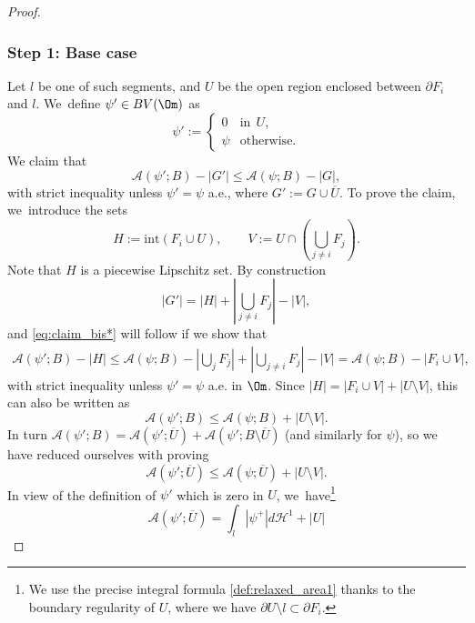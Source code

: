 \begin{proof}
\subsubsection*{Step 1: Base case} Let $l$ be one of such segments, and
$U$ be the open region enclosed between $\partial F_i$ and $l$. We~define $\psi'\in BV(\Om)$ as
\begin{equation*}
\psi':=\begin{cases}
0&\text{in}\ \ U,\\
\psi &\text{otherwise}.
\end{cases}
\end{equation*}
We claim that
\begin{equation}\label{eq:claim_bis*}
\mathcal{A}(\psi';B)-|G'|\le\mathcal{A}(\psi;B)-|G|,
\end{equation}
with strict inequality unless $\psi'=\psi$ a.e., where $G':= G \cup
\overline U$.
To prove the claim, we~introduce the sets
\[
H:=\mathrm{int}(F_i\cup U),\qquad
V:=U\cap(\bigcup_{j\neq i}F_j).
\]
Note that $H$ is a piecewise Lipschitz set.
By construction
\begin{equation*}
|G'|=|{H}|+ |\bigcup_{j\neq i}F_j|-|V|,
\end{equation*}
and \eqref{eq:claim_bis*} will follow if we show that
\begin{equation*}
\begin{split}
\mathcal{A}(\psi';B)-|{H}| \le \mathcal{A}(\psi;B)-|\bigcup_j F_j|+|\bigcup_{j\neq i}F_j|-|V|=\mathcal{A}(\psi;B)-|F_i\cup V|,
\end{split}
\end{equation*}
with strict inequality unless $\psi'=\psi$ a.e. in $\Om$.
Since $|H|=|F_i\cup V|+|U\setminus V|$, this can also be written as
\begin{equation*}
\mathcal{A}(\psi';B)
\le\mathcal{A}(\psi;B)+|U\setminus V|.
\end{equation*}
In turn $\mathcal{A}(\psi';B)=\mathcal{A}(\psi';\overline U)+\mathcal{A}(\psi';B\setminus \overline U)$ (and similarly for $\psi$), so we have reduced ourselves with proving
\begin{equation}\label{eq:claim_tris**}
\mathcal{A}(\psi';\overline U)
\le\mathcal{A}(\psi;\overline U)+|U\setminus V|.
\end{equation}
In view of the definition of $\psi'$ which is zero
in $U$, we~have\footnote{We use the precise integral formula \eqref{def:relaxed_area1} thanks to the boundary regularity of $U$, where we have $\partial U\setminus l\subset \partial F_i$.}
\[
\mathcal{A}(\psi';\overline U)=\int_l|{\psi}^+|d\mathcal H^1+|U|
\]
\end{proof}
